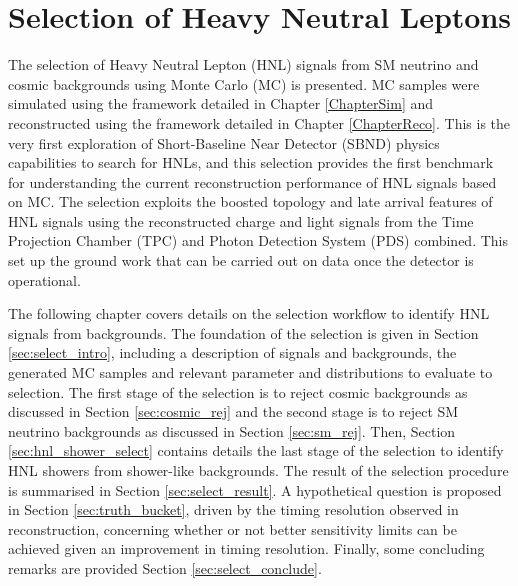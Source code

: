 \chapter{Selection of Heavy Neutral Leptons}
\label{ChapterSelect}

\ifpdf
    \graphicspath{{Chapter9/Figs/Raster/}{Chapter9/Figs/PDF/}{Chapter9/Figs/}}
\else
    \graphicspath{{Chapter9/Figs/Vector/}{Chapter9/Figs/}}
\fi


The selection of Heavy Neutral Lepton (HNL) signals from SM neutrino and cosmic backgrounds using Monte Carlo (MC) is presented.  
MC samples were simulated using the framework detailed in Chapter \ref{ChapterSim} and reconstructed using the framework detailed in Chapter \ref{ChapterReco}.
This is the very first exploration of Short-Baseline Near Detector (SBND) physics capabilities to search for HNLs, and this selection provides the first benchmark for understanding the current reconstruction performance of HNL signals based on MC.
The selection exploits the boosted topology and late arrival features of HNL signals using the reconstructed charge and light signals from the Time Projection Chamber (TPC) and Photon Detection System (PDS) combined.
This set up the ground work that can be carried out on data once the detector is operational.

The following chapter covers details on the selection workflow to identify HNL signals from backgrounds.
The foundation of the selection is given in Section \ref{sec:select_intro}, including a description of signals and backgrounds, the generated MC samples and relevant parameter and distributions to evaluate to selection.
The first stage of the selection is to reject cosmic backgrounds as discussed in Section \ref{sec:cosmic_rej} and the second stage is to reject SM neutrino backgrounds as discussed in Section \ref{sec:sm_rej}.
Then, Section \ref{sec:hnl_shower_select} contains details the last stage of the selection to identify HNL showers from shower-like backgrounds.
The result of the selection procedure is summarised in Section \ref{sec:select_result}.
A hypothetical question is proposed in Section \ref{sec:truth_bucket}, driven by the timing resolution observed in reconstruction, concerning whether or not better sensitivity limits can be achieved given an improvement in timing resolution. 
Finally, some concluding remarks are provided Section \ref{sec:select_conclude}.

